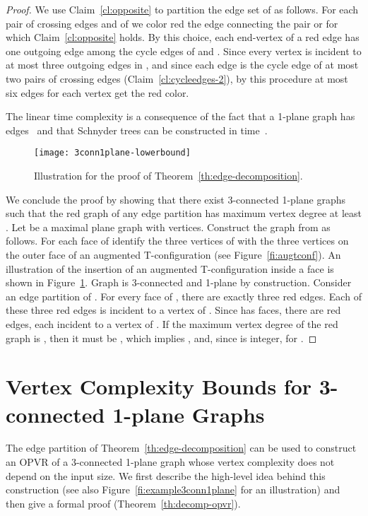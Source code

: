 \documentclass{article}
\newcommand{\opvr}{OPVR\xspace}
\begin{document}
\begin{proof}
We use Claim~\ref{cl:opposite} to partition the edge set of  as follows. For each pair of crossing edges  and  of  we color red the edge connecting the pair  or  for which Claim~\ref{cl:opposite} holds. By this choice, each end-vertex of a red edge has one outgoing edge among the cycle edges of  and . Since every vertex is incident to at most three outgoing edges in , and since each edge is the cycle edge of at most two pairs of crossing edges (Claim~\ref{cl:cycleedges-2}), by this procedure at most six edges for each vertex get the red color. 

The linear time complexity is a consequence of the fact that a 1-plane graph has  edges~\cite{Suzuki2010} and that Schnyder trees can be constructed in  time~\cite{DBLP:conf/soda/Schnyder90}.


\begin{figure}[t]
    \centering
    \texttt{[image: 3conn1plane-lowerbound]}
    \caption{Illustration for the proof of Theorem~\ref{th:edge-decomposition}.}\label{fi:3connlb-1}
\end{figure}

We conclude the proof by showing that there exist 3-connected 1-plane graphs such that the red graph of any edge partition has maximum vertex degree at least .
Let  be a maximal plane graph with  vertices. Construct the graph  from  as follows. For each face  of  identify the three vertices of  with the three vertices on the outer face of an augmented T-configuration (see Figure~\ref{fi:augtconf}). An illustration of the insertion of an augmented T-configuration inside a face  is shown in Figure~\ref{fi:3connlb-1}. Graph  is 3-connected and 1-plane by construction. Consider an edge partition of . For every face  of , there are exactly three red edges. Each of these three red edges is incident to a vertex of . Since  has  faces, there are  red edges, each incident to a vertex of . If the maximum vertex degree of the red graph is , then it must be , which implies , and, since  is integer,  for .
\end{proof}


\section{Vertex Complexity Bounds for 3-connected 1-plane Graphs}\label{se:3conn-bounds}

The edge partition of Theorem~\ref{th:edge-decomposition} can be used to construct an \opvr of a 3-connected 1-plane graph whose vertex complexity does not depend on the input size. We first describe the high-level idea behind this construction (see also Figure~\ref{fi:example3conn1plane} for an illustration) and then give a formal proof (Theorem~\ref{th:decomp-opvr}). 
\end{document}

